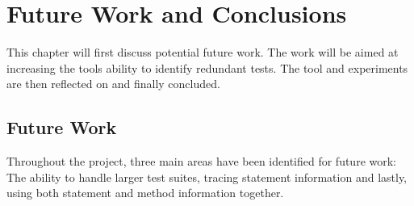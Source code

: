 \chapter{Future Work and Conclusions}\label{C:future}

This chapter will first discuss potential future work. The work will be aimed at increasing the tools ability to identify redundant tests. The tool and experiments are then reflected on and finally concluded. 

\section{Future Work}
Throughout the project, three main areas have been identified for future work: The ability to handle larger test suites, tracing statement information and lastly, using both statement and method information together.

